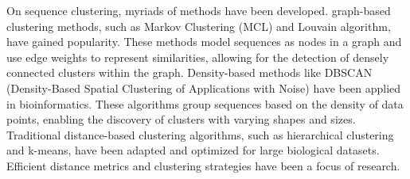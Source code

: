 On sequence clustering, myriads of methods have been developed. graph-based clustering methods, such as Markov Clustering (MCL) and Louvain algorithm, have gained popularity. These methods model sequences as nodes in a graph and use edge weights to represent similarities, allowing for the detection of densely connected clusters within the graph. Density-based methods like DBSCAN (Density-Based Spatial Clustering of Applications with Noise) have been applied in bioinformatics. These algorithms group sequences based on the density of data points, enabling the discovery of clusters with varying shapes and sizes. Traditional distance-based clustering algorithms, such as hierarchical clustering and k-means, have been adapted and optimized for large biological datasets. Efficient distance metrics and clustering strategies have been a focus of research.
\begin{comment}
**Deep Learning in Clustering: Deep learning techniques, particularly autoencoders and neural networks, have been explored for clustering biological sequences. These methods can learn intricate patterns and representations from raw sequence data, potentially improving clustering accuracy.

Recent Software and Tools:
**CD-HIT: CD-HIT is a widely used tool for clustering biological sequences. It allows users to cluster large datasets and select a representative sequence from each cluster based on a specified threshold.

**UCLUST: UCLUST is part of the USEARCH suite and is designed for fast sequence clustering. It uses a greedy algorithm to form clusters and is efficient for large datasets.

**MMseqs2: MMseqs2 is a software suite for sequence searching and clustering. It provides fast and sensitive sequence clustering algorithms, making it suitable for large-scale bioinformatics analyses.

**DADA2: DADA2 is a bioinformatics pipeline for the analysis of amplicon sequencing data (e.g., 16S rRNA). While it's primarily used for sequence error correction, it also involves the clustering of similar sequences into amplicon sequence variants (ASVs).

**Swarm: Swarm is a density-based clustering algorithm designed to cluster biological sequences. It's particularly useful for clustering operational taxonomic units (OTUs) in microbial ecology studies.

**HDBSCAN: HDBSCAN (Hierarchical Density-Based Spatial Clustering of Applications with Noise) is a density-based clustering algorithm that can find clusters of varying densities. It's useful for discovering clusters in datasets where clusters of different densities exist.
\end{comment}